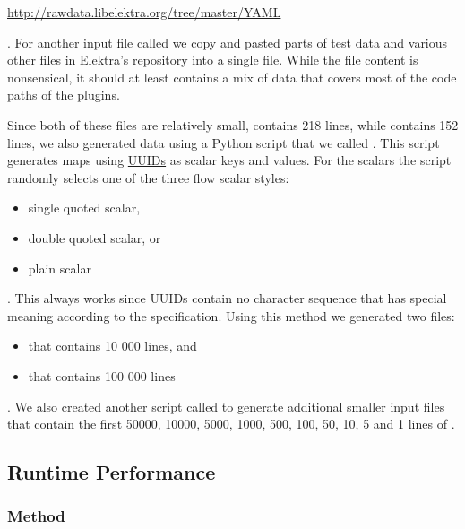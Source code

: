 \begin{leftbar}
  \url{http://rawdata.libelektra.org/tree/master/YAML}
\end{leftbar}

. For another input file called \FileCombined{} we copy and pasted parts of test data and various other  files in Elektra’s repository into a single file. While the file content is nonsensical, it should at least contains a mix of  data that covers most of the code paths of the  plugins.

Since both of these files are relatively small, \FileKeyFrames{} contains 218 lines, while \FileCombined{} contains 152 lines, we also generated data using a Python script that we called \FileGenerateYAML{}. This script generates  maps using \href{https://en.wikipedia.org/wiki/Universally_unique_identifier}{\glspl{UUID}} as scalar keys and values. For the  scalars the script randomly selects one of the three flow scalar styles:

\begin{itemize}
  \item single quoted scalar,
  \item double quoted scalar, or
  \item plain scalar
\end{itemize}

. This always works since \glspl{UUID} contain no character sequence that has special meaning according to the  specification. Using this method we generated two files:

\begin{itemize}
  \item \FileGenerated{} that contains 10 000 lines, and

  \item \FileGeneratedHundredThousand{} that contains 100 000 lines
\end{itemize}

. We also created another script called \FileCutInput{} to generate additional smaller input files that contain the first 50000, 10000, 5000, 1000, 500, 100, 50, 10, 5 and 1 lines of \FileGeneratedHundredThousand{}.

\subsection{Runtime Performance}
\label{sec:run_time_performance}

\subsubsection{Method}

